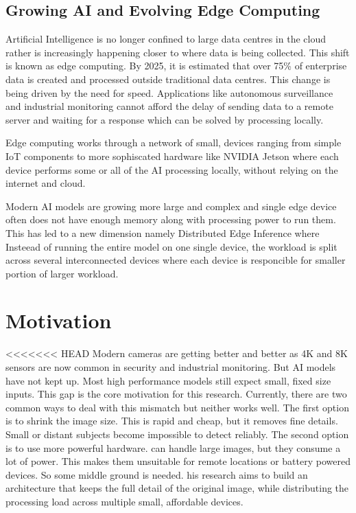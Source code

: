 \subsection*{Growing AI and Evolving Edge Computing}
Artificial Intelligence is no longer confined to large data centres in the cloud rather is increasingly happening closer to where data is being collected. This shift is known as edge computing. By 2025, it is estimated that over 75\% of enterprise data is created and processed outside traditional data centres\cite{forbes2025}.
This change is being driven by the need for speed. Applications like autonomous surveillance and industrial monitoring cannot afford the delay of sending data to a remote server and waiting for a response which can be solved by processing locally\cite{assured2025}.

Edge computing works through a network of small, devices ranging from simple IoT components to more sophiscated hardware like NVIDIA Jetson where each device performs some or all of the AI processing locally, without relying on the internet and cloud.

Modern AI models are growing more large and complex and single edge device often does not have enough memory along with processing power to run them. This has led to a new dimension namely Distributed Edge Inference \cite{distredge2025}  where Insteead of running the entire model on one single device, the workload is split across several interconnected devices where each device is responcible for smaller portion of larger workload.

\section{Motivation}
<<<<<<< HEAD
Modern cameras are getting better and better as 4K and 8K sensors are now common in security and industrial monitoring. But AI models have not kept up. Most high performance models still expect small, fixed size inputs. This gap is the core motivation for this research.
Currently, there are two common ways to deal with this mismatch but neither works well.
The first option is to shrink the image size. This is rapid and cheap, but it removes fine details. Small or distant subjects become impossible to detect reliably.
The second option is to use more powerful hardware.  can handle large images, but they consume a lot of power. This makes them unsuitable for remote locations or battery powered devices.
So some middle ground is needed. his research aims to build  an architecture that keeps the full detail of the original image, while distributing the processing load across multiple small, affordable devices.



